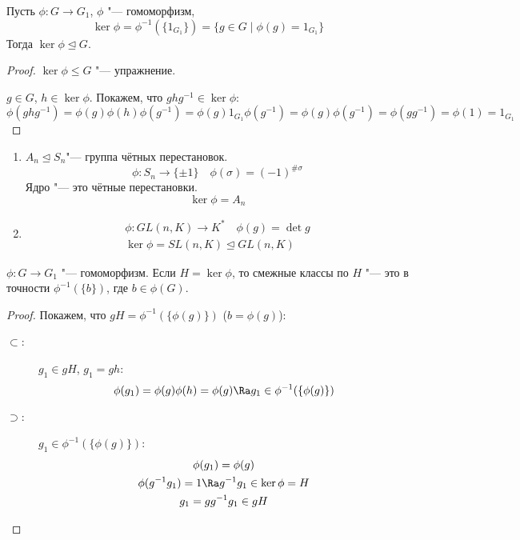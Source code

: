 \begin{theorem}
	Пусть $\phi\colon G \to G_1$, $\phi$ "--- гомоморфизм,
	\[ \ker \phi = \phi^{-1}(\{1_{G_1}\}) = \{g \in G \mid \phi(g) = 1_{G_1}\} \]
	Тогда $\ker \phi \unlhd G$.
\end{theorem}
\begin{proof}
	$\ker \phi \le G$ "--- упражнение.

	$g \in G$, $h \in \ker \phi$.
	Покажем, что $ghg^{-1} \in \ker \phi$:
	\[
		\phi(ghg^{-1}) = \phi(g)\phi(h)\phi(g^{-1}) = \phi(g)1_{G_1}\phi(g^{-1}) = \phi(g)\phi(g^{-1}) = \phi(gg^{-1}) = \phi(1) = 1_{G_1}
	\]
\end{proof}

\begin{exmp}\hfill\begin{enumerate}
\item
	$A_n \unlhd S_n$"--- группа чётных перестановок.
	\[ \phi\colon S_n \to \{\pm 1\} \quad \phi(\sigma) = (-1)^{\#\sigma} \]
	Ядро "--- это чётные перестановки.
	\[ \ker \phi = A_n \]

\item
	\begin{gather*}
		\phi\colon GL(n,K) \to K^* \quad \phi(g) = \det g \\
		\ker \phi = SL(n, K) \unlhd GL(n, K)
	\end{gather*}
\end{enumerate}\end{exmp}

\begin{lemma}
	$\phi\colon G \to G_1$ "--- гомоморфизм.
	Если $H = \ker \phi$, то смежные классы по $H$ "--- это в точности $\phi^{-1}(\{b\})$, где $b \in \phi(G)$.
\end{lemma}
\begin{proof}
	Покажем, что $gH = \phi^{-1}(\{\phi(g)\})$ ($b = \phi(g)$):
	\begin{description}
	\item[$\subset$:]
		$g_1 \in gH$, $g_1 = gh$:
		\[ \phi(g_1) = \phi(g)\phi(h) = \phi(g) \Ra g_1 \in \phi^{-1}(\{\phi(g)\}) \]

	\item[$\supset$:]
		$g_1 \in \phi^{-1}(\{\phi(g)\})$:
		\begin{gather*}
			\phi(g_1) = \phi(g) \\
			\phi(g^{-1}g_1) = 1 \Ra g^{-1}g_1 \in \ker \phi = H \\
			g_1 = gg^{-1}g_1 \in gH
		\end{gather*}
	\end{description}
\end{proof}

